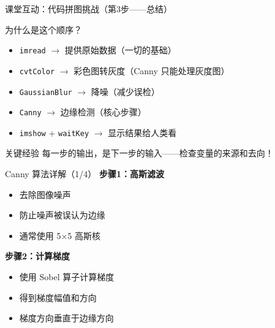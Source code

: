 \begin{frame}{课堂互动：代码拼图挑战（第3步——总结）}
    \begin{block}{为什么是这个顺序？}
        \begin{itemize}
            \item \texttt{imread} $\rightarrow$ 提供原始数据（一切的基础）
            \item \texttt{cvtColor} $\rightarrow$ 彩色图转灰度（Canny 只能处理灰度图）
            \item \texttt{GaussianBlur} $\rightarrow$ 降噪（减少误检）
            \item \texttt{Canny} $\rightarrow$ 边缘检测（核心步骤）
            \item \texttt{imshow} + \texttt{waitKey} $\rightarrow$ 显示结果给人类看
        \end{itemize}
    \end{block}

    \pause
    \vspace{0.3cm}

    \begin{uncoverenv}
        \begin{alertblock}{关键经验}
            每一步的输出，是下一步的输入——检查变量的来源和去向！
        \end{alertblock}
    \end{uncoverenv}
\end{frame}

\begin{frame}{Canny 算法详解（1/4）}
    \textbf{步骤1：高斯滤波}
    \begin{itemize}
        \item 去除图像噪声
        \item 防止噪声被误认为边缘
        \item 通常使用 5×5 高斯核
    \end{itemize}

    \pause
    \vspace{0.3cm}

    \begin{uncoverenv}
        \textbf{步骤2：计算梯度}
        \begin{itemize}
            \item 使用 Sobel 算子计算梯度
            \item 得到梯度幅值和方向
            \item 梯度方向垂直于边缘方向
        \end{itemize}
    \end{uncoverenv}
\end{frame}

